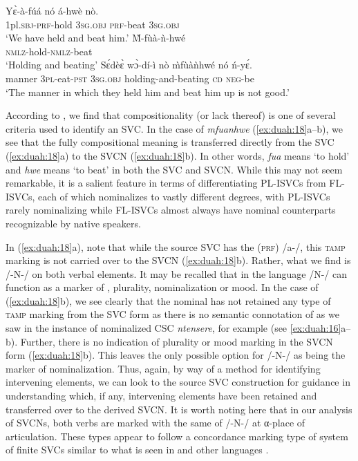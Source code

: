 \documentclass[output=paper
,newtxmath
,modfonts
,nonflat]{langsci/langscibook}
\begin{document}
\ea\label{ex:duah:18}
\ea\label{ex:duah:18a}
\gll Yɛ̀-à-fúá nó á-hwè nò.\\
1pl.\textsc{sbj}-\textsc{prf}-hold 3\textsc{sg}.\textsc{obj} \textsc{prf}-beat 3\textsc{sg}.\textsc{obj}\\
\glt `We have held and beat him.'
\ex\label{ex:duah:18b}
\gll M̀-fùà-ǹ-hwé\\
\textsc{nmlz}-hold-\textsc{nmlz}-beat\\
\glt `Holding and beating'
\ex\label{ex:duah:18c}
\gll Sɛ́dèɛ̀ wɔ̀-dí-ì nò m̀fùàǹhwé nó ń-yɛ́.\\
manner 3\textsc{pl}-eat-\textsc{pst}	3\textsc{sg}.\textsc{obj}	holding-and-beating	\textsc{cd} \textsc{neg}-be\\
\glt `The manner in which they held him and beat him up is not good.'
\z
\z

According to \citet{barkema1996}, we find that compositionality (or lack thereof) is one of several criteria used to identify an SVC. In the case of \textit{mfuanhwe} (\ref{ex:duah:18}a--b), we see that the fully compositional meaning is transferred directly from the SVC (\ref{ex:duah:18}a) to the SVCN (\ref{ex:duah:18}b). In other words, \textit{fua} means ‘to hold’ and \textit{hwe} means ‘to beat’ in both the SVC and SVCN. While this may not seem remarkable, it is a salient feature in terms of differentiating PL-ISVCs from FL-ISVCs, each of which nominalizes to vastly different degrees, with PL-ISVCs rarely nominalizing while FL-ISVCs almost always have nominal counterparts recognizable by native speakers.

In (\ref{ex:duah:18}a), note that while the source SVC has the  (\textsc{prf}) /a-/, this \textsc{tamp} marking is not carried over to the SVCN (\ref{ex:duah:18}b). Rather, what we find is /-N-/ on both verbal elements. It may be recalled that in the  language /N-/ can function as a marker of , plurality, nominalization or mood. In the case of (\ref{ex:duah:18}b), we see clearly that the nominal has not retained any type of \textsc{tamp} marking from the SVC form as there is no semantic connotation of  as we saw in the instance of nominalized CSC \textit{ntensere}, for example (see \ref{ex:duah:16}a--b). Further, there is no indication of plurality or mood marking in the SVCN form (\ref{ex:duah:18}b). This leaves the only possible option for /-N-/ as being the marker of nominalization. Thus, again, by way of a method for identifying intervening elements, we can look to the source SVC construction for guidance in understanding which, if any, intervening elements have been retained and transferred over to the derived SVCN. It is worth noting here that in our analysis of SVCNs, both verbs are marked with the same  of /-N-/ at α-place of articulation. These types appear to follow a concordance marking type of system of finite SVCs similar to what is seen in  and other  languages \citep{aikhenvald2006}.\footnotemark 
\end{document}
